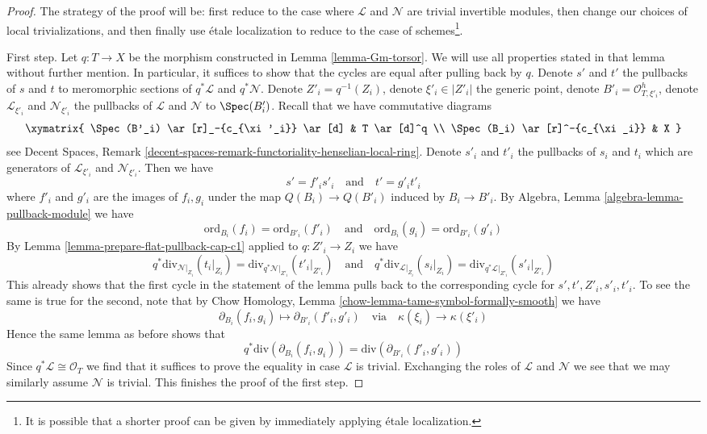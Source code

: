 \begin{proof}
The strategy of the proof will be: first reduce to the case where
$\mathcal{L}$ and $\mathcal{N}$ are trivial invertible modules,
then change our choices of local trivializations, and then finally
use \'etale localization to reduce to the case of schemes\footnote{It
is possible that a shorter proof can be given by immediately
applying \'etale localization.}.

\medskip\noindent
First step. Let $q : T \to X$ be the morphism constructed in
Lemma \ref{lemma-Gm-torsor}. We will use all properties stated in
that lemma without further mention. In particular, it suffices to
show that the cycles are equal after pulling back by $q$.
Denote $s'$ and $t'$ the pullbacks of $s$ and $t$ to meromorphic sections
of $q^*\mathcal{L}$ and $q^*\mathcal{N}$.
Denote $Z'_i = q^{-1}(Z_i)$, denote $\xi'_i \in |Z'_i|$ the generic point,
denote $B'_i = \mathcal{O}_{T, \xi'_i}^h$, denote
$\mathcal{L}_{\xi'_i}$ and $\mathcal{N}_{\xi'_i}$ the pullbacks
of $\mathcal{L}$ and $\mathcal{N}$ to $\Spec(B'_i)$.
Recall that we have commutative diagrams
$$
\xymatrix{
\Spec(B'_i) \ar[r]_-{c_{\xi'_i}} \ar[d] & T \ar[d]^q \\
\Spec(B_i) \ar[r]^-{c_{\xi_i}} & X
}
$$
see Decent Spaces, Remark
\ref{decent-spaces-remark-functoriality-henselian-local-ring}.
Denote $s'_i$ and $t'_i$ the pullbacks of $s_i$ and $t_i$ which
are generators of $\mathcal{L}_{\xi'_i}$ and $\mathcal{N}_{\xi'_i}$.
Then we have
$$
s' = f'_i s'_i
\quad\text{and}\quad
t' = g'_i t'_i
$$
where $f'_i$ and $g'_i$ are the images of $f_i, g_i$
under the map $Q(B_i) \to Q(B'_i)$ induced by $B_i \to B'_i$.
By Algebra, Lemma \ref{algebra-lemma-pullback-module} we have
$$
\text{ord}_{B_i}(f_i) = \text{ord}_{B'_i}(f'_i)
\quad\text{and}\quad
\text{ord}_{B_i}(g_i) = \text{ord}_{B'_i}(g'_i)
$$
By Lemma \ref{lemma-prepare-flat-pullback-cap-c1} applied
to $q : Z'_i \to Z_i$ we have
$$
q^*\text{div}_{\mathcal{N}|_{Z_i}}(t_i|_{Z_i}) =
\text{div}_{q^*\mathcal{N}|_{Z'_i}}(t'_i|_{Z'_i})
\quad\text{and}\quad
q^*\text{div}_{\mathcal{L}|_{Z_i}}(s_i|_{Z_i}) =
\text{div}_{q^*\mathcal{L}|_{Z'_i}}(s'_i|_{Z'_i})
$$
This already shows that the first cycle in the statement of the
lemma pulls back to the corresponding cycle for
$s', t', Z'_i, s'_i, t'_i$. To see the same is true for the
second, note that by
Chow Homology, Lemma \ref{chow-lemma-tame-symbol-formally-smooth} we have
$$
\partial_{B_i}(f_i, g_i) \mapsto
\partial_{B'_i}(f'_i, g'_i)
\quad\text{via}\quad
\kappa(\xi_i) \to \kappa(\xi'_i)
$$
Hence the same lemma as before shows that
$$
q^*\text{div}(\partial_{B_i}(f_i, g_i)) =
\text{div}(\partial_{B'_i}(f'_i, g'_i))
$$
Since $q^*\mathcal{L} \cong \mathcal{O}_T$ we find that it suffices
to prove the equality in case $\mathcal{L}$ is trivial.
Exchanging the roles of $\mathcal{L}$ and $\mathcal{N}$ we
see that we may similarly assume $\mathcal{N}$ is trivial.
This finishes the proof of the first step.


\end{proof}
